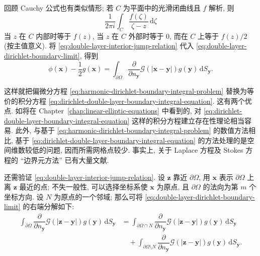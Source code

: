 回顾 Cauchy 公式也有类似情形; 若 $C$ 为平面中的光滑闭曲线且 $f$ 解析, 则
\begin{equation}\label{eq:cauchy-integral-boundary-principal-value-analogue}
\dfrac1{2\pi i}\int_C\dfrac{f(\zeta)}{\zeta-z}\,\mathrm{d}\zeta
\end{equation}
当 $z$ 在 $C$ 内部时等于 $f(z)$, 当 $z$ 在 $C$ 外部时等于 0, 而在 $C$ 上等于 $f(z)/2$ (按主值意义). 将 \eqref{eq:double-layer-interior-jump-relation} 代入 \eqref{eq:double-layer-dirichlet-boundary-limit}, 得到
\begin{equation}\label{eq:dirichlet-double-layer-boundary-integral-equation}
\phi(\bm{x})-\dfrac12g(\bm{x})=\int_{\partial\Omega}\dfrac{\partial}{\partial n_{\bm{y}}}\mathcal{G}(|\bm{x}-\bm{y}|)g(\bm{y})\,\mathrm{d}S_{\bm{y}}.
\end{equation}


这样就把偏微分方程 \eqref{eq:harmonic-dirichlet-boundary-integral-problem} 替换为等价的积分方程 \eqref{eq:dirichlet-double-layer-boundary-integral-equation}. 这有两个优点. 如将在 Chapter~\ref{chap:linear-elliptic-equations} 中看到的, 对 \eqref{eq:dirichlet-double-layer-boundary-integral-equation} 这样的积分方程建立存在性理论相当容易. 此外, 与基于 \eqref{eq:harmonic-dirichlet-boundary-integral-problem} 的数值方法相比, 基于 \eqref{eq:dirichlet-double-layer-boundary-integral-equation} 的方法处理的是空间维数较低的问题, 因而所需网格点较少. 事实上, 关于 Laplace 方程及 Stokes 方程的 ``边界元方法'' 已有大量文献.

还需验证 \eqref{eq:double-layer-interior-jump-relation}. 设 $\bm{z}$ 靠近 $\partial\Omega$, 用 $\bm{x}$ 表示 $\partial\Omega$ 上离 $\bm{z}$ 最近的点; 不失一般性, 可以选择坐标系使 $\bm{x}$ 为原点, 且 $\partial\Omega$ 的法向为第 $m$ 个坐标方向. 设 $N$ 为原点的一个邻域; 那么可将 \eqref{eq:double-layer-dirichlet-boundary-limit} 的右端分解如下:
\begin{equation}\label{eq:double-layer-local-distant-splitting}
\begin{aligned}
\int_{\partial\Omega}\dfrac{\partial}{\partial n_{\bm{y}}}\mathcal{G}(|\bm{z}-\bm{y}|)g(\bm{y})\,\mathrm{d}S_{\bm{y}}
&=\int_{\partial\Omega\cap N}\dfrac{\partial}{\partial n_{\bm{y}}}\mathcal{G}(|\bm{z}-\bm{y}|)g(\bm{y})\,\mathrm{d}S_{\bm{y}}\\
&\quad+\int_{\partial\Omega\setminus N}\dfrac{\partial}{\partial n_{\bm{y}}}\mathcal{G}(|\bm{z}-\bm{y}|)g(\bm{y})\,\mathrm{d}S_{\bm{y}}.
\end{aligned}
\end{equation}


